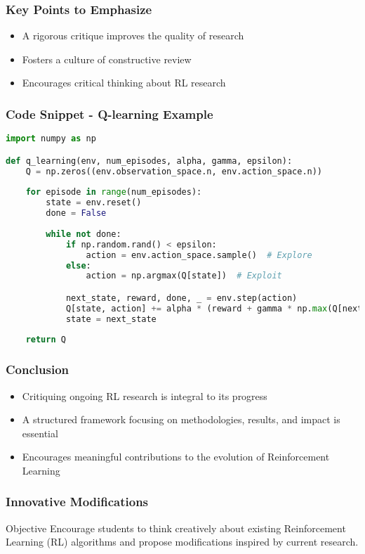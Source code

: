 \documentclass{beamer}
\begin{document}
\begin{frame}
    \frametitle{Key Points to Emphasize}
    \begin{itemize}
        \item A rigorous critique improves the quality of research
        \item Fosters a culture of constructive review
        \item Encourages critical thinking about RL research
    \end{itemize}
\end{frame}

\begin{frame}[fragile]
    \frametitle{Code Snippet - Q-learning Example}
    \begin{lstlisting}[language=Python]
import numpy as np

def q_learning(env, num_episodes, alpha, gamma, epsilon):
    Q = np.zeros((env.observation_space.n, env.action_space.n))
    
    for episode in range(num_episodes):
        state = env.reset()
        done = False
        
        while not done:
            if np.random.rand() < epsilon:
                action = env.action_space.sample()  # Explore
            else:
                action = np.argmax(Q[state])  # Exploit

            next_state, reward, done, _ = env.step(action)
            Q[state, action] += alpha * (reward + gamma * np.max(Q[next_state]) - Q[state, action])
            state = next_state
            
    return Q
    \end{lstlisting}
\end{frame}

\begin{frame}
    \frametitle{Conclusion}
    \begin{itemize}
        \item Critiquing ongoing RL research is integral to its progress
        \item A structured framework focusing on methodologies, results, and impact is essential
        \item Encourages meaningful contributions to the evolution of Reinforcement Learning
    \end{itemize}
\end{frame}

\begin{frame}
    \frametitle{Innovative Modifications}
    \begin{block}{Objective}
        Encourage students to think creatively about existing Reinforcement Learning (RL) algorithms and propose modifications inspired by current research.
    \end{block}
\end{frame}
\end{document}
